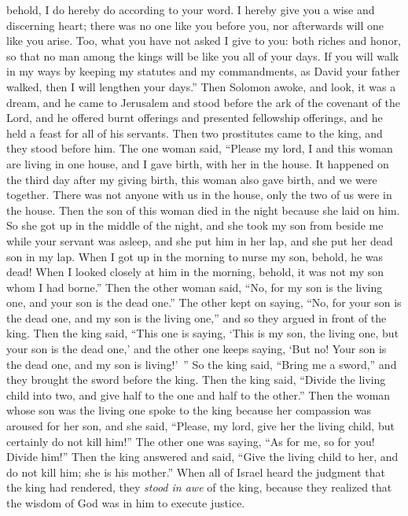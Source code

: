 \begin{biblechapter}
\verse behold, I do hereby do according to your word. I hereby give you a wise and discerning heart; there was no one like you before you, nor afterwards will one like you arise.
\verse Too, what you have not asked I give to you: both riches and honor, so that no man among the kings will be like you all of your days.
\verse If you will walk in my ways by keeping my statutes and my commandments, as David your father walked, then I will lengthen your days.”
\verse Then Solomon awoke, and look, it was a dream, and he came to Jerusalem and stood before the ark of the covenant of the Lord, and he offered burnt offerings and presented fellowship offerings, and he held a feast for all of his servants.
 Then two prostitutes came to the king, and they stood before him.
\verse The one woman said, “Please my lord, I and this woman are living in one house, and I gave birth, with her in the house.
\verse It happened on the third day after my giving birth, this woman also gave birth, and we were together. There was not anyone with us in the house, only the two of us were in the house.
\verse Then the son of this woman died in the night because she laid on him.
\verse So she got up in the middle of the night, and she took my son from beside me while your servant was asleep, and she put him in her lap, and she put her dead son in my lap.
\verse When I got up in the morning to nurse my son, behold, he was dead! When I looked closely at him in the morning, behold, it was not my son whom I had borne.”
\verse Then the other woman said, “No, for my son is the living one, and your son is the dead one.” The other kept on saying, “No, for your son is the dead one, and my son is the living one,” and so they argued in front of the king.
\verse Then the king said, “This one is saying, ‘This is my son, the living one, but your son is the dead one,’ and the other one keeps saying, ‘But no! Your son is the dead one, and my son is living!’ ”
\verse So the king said, “Bring me a sword,” and they brought the sword before the king.
\verse Then the king said, “Divide the living child into two, and give half to the one and half to the other.”
\verse Then the woman whose son was the living one spoke to the king because her compassion was aroused for her son, and she said, “Please, my lord, give her the living child, but certainly do not kill him!” The other one was saying, “As for me, so for you! Divide him!”
\verse Then the king answered and said, “Give the living child to her, and do not kill him; she is his mother.”
\verse When all of Israel heard the judgment that the king had rendered, they \textit{stood in awe} of the king, because they realized that the wisdom of God was in him to execute justice.
\end{biblechapter}

